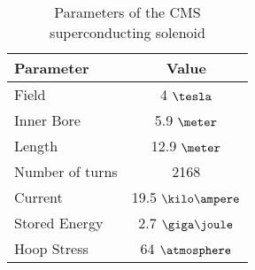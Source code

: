 \begin{table}[!htb]
  \centering
  \begin{tabular}{|l|c|}
  \hline
  Parameter & Value \\
  \hline\hline
  Field           & 4     $\tesla$ \\
  Inner Bore      & 5.9   $\meter$ \\
  Length          & 12.9  $\meter$ \\
  Number of turns & 2168           \\
  Current         & 19.5  $\kilo\ampere$ \\
  Stored Energy   & 2.7   $\giga\joule$  \\
  Hoop Stress     & 64    $\atmosphere$ \\
  \hline
  \end{tabular}
  \caption[Parameters of the CMS superconducting solenoid]{Parameters of the CMS superconducting solenoid \cite{CMSTDR:CMSPhysicsVol1}}
  \label{TABLE:ExperimentalApparatus_CMSMagnetParameters}
\end{table}
